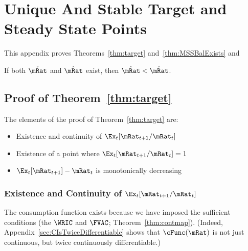 \documentclass[\econtexRoot/BufferStockTheory]{subfiles}
\begin{document}

\hypertarget{ApndxMTargetIsStable}{}
\section{Unique And Stable Target and Steady State Points}\label{sec:ApndxMTargetIsStable}


This appendix proves Theorems~\ref{thm:target} and~\ref{thm:MSSBalExists} and 
\onlyinsubfile{\setcounter{theorem}{1}}

%

%  

  \begin{lemma}
  If both $\check{\mRat}$ and $\hat{\mRat}$ exist, then $\hat{\mRat} < \check{\mRat}$.
  \end{lemma}

  \subsection{Proof of Theorem~\ref{thm:target}}
  
  The elements of the proof of Theorem~\ref{thm:target} are:
\begin{itemize}
\item Existence and continuity of $\Ex_t [{\mRat}_{t+1}/\mRat_t]$
\item Existence of a point where $\Ex_t [{\mRat}_{t+1}/\mRat_t] = 1$
\item $\Ex_t [{\mRat}_{t+1}]-\mRat_{t}$ is monotonically decreasing
\end{itemize}


\subsubsection{Existence and Continuity of
  \texorpdfstring{$\Ex_t [{\mRat}_{t+1}/\mRat_t]$}{Ex-{t}[mRat-{t+1}/mRat-{t}]}}\label{subsubsec:RatExitsCont}
The consumption function exists because we have imposed the sufficient conditions (the $\WRIC$ and $\FVAC$; Theorem~\ref{thm:contmap}).  (Indeed, Appendix~\ref{sec:CIsTwiceDifferentiable} shows that $\cFunc(\mRat)$ is not just continuous, but twice continuously differentiable.)
\end{document}
